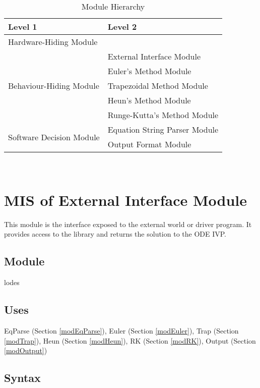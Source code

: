 \documentclass[12pt, titlepage]{article}
\begin{document}
\begin{table}[h!]
\centering
\begin{tabular}{p{} p{}}
\toprule
\textbf{Level 1} & \textbf{Level 2}\\
\midrule

{Hardware-Hiding Module} & ~ \\
\midrule

\multirow{5}{0.3\textwidth}{Behaviour-Hiding Module} & External Interface Module\\
& Euler's Method Module\\
& Trapezoidal Method Module\\
& Heun's Method Module\\
& Runge-Kutta's Method Module\\
\midrule

\multirow{2}{0.3\textwidth}{Software Decision Module} & {Equation String Parser Module}\\
& Output Format Module\\
\bottomrule

\end{tabular}
\caption{Module Hierarchy}
\label{TblMH}
\end{table}

\newpage
~\newpage

\section{MIS of External Interface Module} \label{modExternalInterface}
This module is the interface exposed to the external world or driver program.
It provides access to the library and returns the solution to the ODE IVP.

\subsection{Module}
lodes


\subsection{Uses}

EqParse (Section \ref{modEqParse}), Euler (Section \ref{modEuler}), Trap (Section \ref{modTrap}),
Heun (Section \ref{modHeun}), RK (Section \ref{modRK}), Output (Section \ref{modOutput})

\subsection{Syntax}
\end{document}
